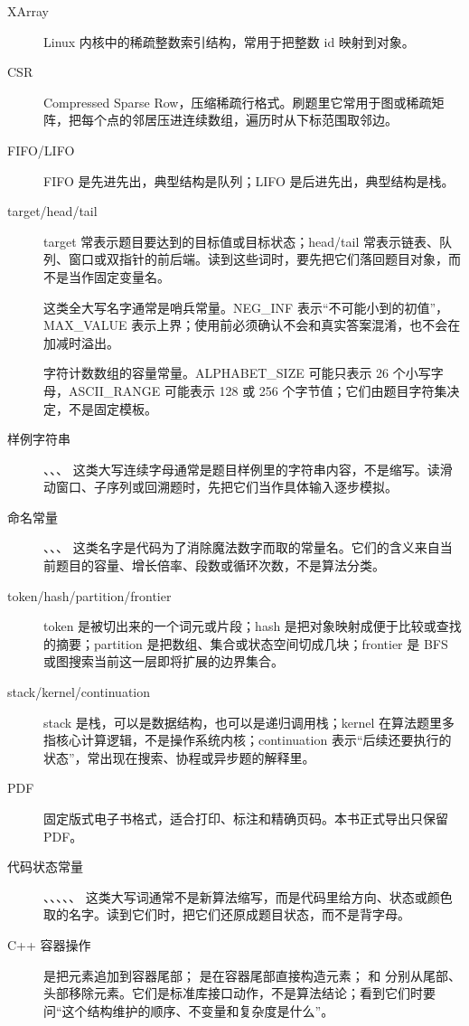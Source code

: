 \begin{description}
  \item[XArray] Linux 内核中的稀疏整数索引结构，常用于把整数 id 映射到对象。
  \item[CSR] Compressed Sparse Row，压缩稀疏行格式。刷题里它常用于图或稀疏矩阵，把每个点的邻居压进连续数组，遍历时从下标范围取邻边。
  \item[FIFO/LIFO] FIFO 是先进先出，典型结构是队列；LIFO 是后进先出，典型结构是栈。
  \item[target/head/tail] target 常表示题目要达到的目标值或目标状态；head/tail 常表示链表、队列、窗口或双指针的前后端。读到这些词时，要先把它们落回题目对象，而不是当作固定变量名。
  \item[] 这类全大写名字通常是哨兵常量。NEG\_INF 表示“不可能小到的初值”，MAX\_VALUE 表示上界；使用前必须确认不会和真实答案混淆，也不会在加减时溢出。
  \item[] 字符计数数组的容量常量。ALPHABET\_SIZE 可能只表示 26 个小写字母，ASCII\_RANGE 可能表示 128 或 256 个字节值；它们由题目字符集决定，不是固定模板。
  \item[样例字符串] 、、、 这类大写连续字母通常是题目样例里的字符串内容，不是缩写。读滑动窗口、子序列或回溯题时，先把它们当作具体输入逐步模拟。
  \item[命名常量] 、、、 这类名字是代码为了消除魔法数字而取的常量名。它们的含义来自当前题目的容量、增长倍率、段数或循环次数，不是算法分类。
  \item[token/hash/partition/frontier] token 是被切出来的一个词元或片段；hash 是把对象映射成便于比较或查找的摘要；partition 是把数组、集合或状态空间切成几块；frontier 是 BFS 或图搜索当前这一层即将扩展的边界集合。
  \item[stack/kernel/continuation] stack 是栈，可以是数据结构，也可以是递归调用栈；kernel 在算法题里多指核心计算逻辑，不是操作系统内核；continuation 表示“后续还要执行的状态”，常出现在搜索、协程或异步题的解释里。
  \item[PDF] 固定版式电子书格式，适合打印、标注和精确页码。本书正式导出只保留 PDF。
  \item[代码状态常量] 、、、、、 这类大写词通常不是新算法缩写，而是代码里给方向、状态或颜色取的名字。读到它们时，把它们还原成题目状态，而不是背字母。
  \item[C++ 容器操作]  是把元素追加到容器尾部； 是在容器尾部直接构造元素； 和  分别从尾部、头部移除元素。它们是标准库接口动作，不是算法结论；看到它们时要问“这个结构维护的顺序、不变量和复杂度是什么”。

\end{description}
